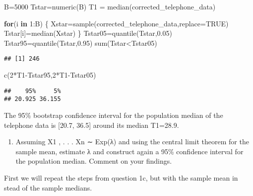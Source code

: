 \documentclass[
]{article}
\newenvironment{Shaded}{\begin{snugshade}}{\end{snugshade}}
\newcommand{\AttributeTok}[1]{\textcolor[rgb]{0.77,0.63,0.00}{#1}}
\newcommand{\ConstantTok}[1]{\textcolor[rgb]{0.00,0.00,0.00}{#1}}
\newcommand{\ControlFlowTok}[1]{\textcolor[rgb]{0.13,0.29,0.53}{\textbf{#1}}}
\newcommand{\DecValTok}[1]{\textcolor[rgb]{0.00,0.00,0.81}{#1}}
\newcommand{\FloatTok}[1]{\textcolor[rgb]{0.00,0.00,0.81}{#1}}
\newcommand{\FunctionTok}[1]{\textcolor[rgb]{0.00,0.00,0.00}{#1}}
\newcommand{\NormalTok}[1]{#1}
\newcommand{\OtherTok}[1]{\textcolor[rgb]{0.56,0.35,0.01}{#1}}
\newcommand{\SpecialCharTok}[1]{\textcolor[rgb]{0.00,0.00,0.00}{#1}}
\providecommand{\tightlist}{%
  \setlength{\itemsep}{0pt}\setlength{\parskip}{0pt}}
\begin{document}
\begin{Shaded}
\begin{Highlighting}[]
\NormalTok{B}\OtherTok{=}\DecValTok{5000}
\NormalTok{Tstar}\OtherTok{=}\FunctionTok{numeric}\NormalTok{(B)}
\NormalTok{T1 }\OtherTok{=} \FunctionTok{median}\NormalTok{(corrected\_telephone\_data)}

\ControlFlowTok{for}\NormalTok{(i }\ControlFlowTok{in} \DecValTok{1}\SpecialCharTok{:}\NormalTok{B) \{}
\NormalTok{  Xstar}\OtherTok{=}\FunctionTok{sample}\NormalTok{(corrected\_telephone\_data,}\AttributeTok{replace=}\ConstantTok{TRUE}\NormalTok{)}
\NormalTok{  Tstar[i]}\OtherTok{=}\FunctionTok{median}\NormalTok{(Xstar) \}}
\NormalTok{  Tstar05}\OtherTok{=}\FunctionTok{quantile}\NormalTok{(Tstar,}\FloatTok{0.05}\NormalTok{)}
\NormalTok{  Tstar95}\OtherTok{=}\FunctionTok{quantile}\NormalTok{(Tstar,}\FloatTok{0.95}\NormalTok{)}
  \FunctionTok{sum}\NormalTok{(Tstar}\SpecialCharTok{\textless{}}\NormalTok{Tstar05)}
\end{Highlighting}
\end{Shaded}

\begin{verbatim}
## [1] 246
\end{verbatim}

\begin{Shaded}
\begin{Highlighting}[]
\FunctionTok{c}\NormalTok{(}\DecValTok{2}\SpecialCharTok{*}\NormalTok{T1}\SpecialCharTok{{-}}\NormalTok{Tstar95,}\DecValTok{2}\SpecialCharTok{*}\NormalTok{T1}\SpecialCharTok{{-}}\NormalTok{Tstar05)}
\end{Highlighting}
\end{Shaded}

\begin{verbatim}
##    95%     5% 
## 20.925 36.155
\end{verbatim}

The 95\% bootstrap confidence interval for the population median of the
telephone data is {[}20.7, 36.5{]} around its median T1=28.9.

\begin{enumerate}
\def\labelenumi{\alph{enumi})}
\setcounter{enumi}{3}
\tightlist
\item
  Assuming X1 , . . . Xn ∼ Exp(λ) and using the central limit theorem
  for the sample mean, estimate λ and construct again a 95\% confidence
  interval for the population median. Comment on your findings.
\end{enumerate}

First we will repeat the steps from question 1c, but with the sample
mean in stead of the sample medians.
\end{document}
